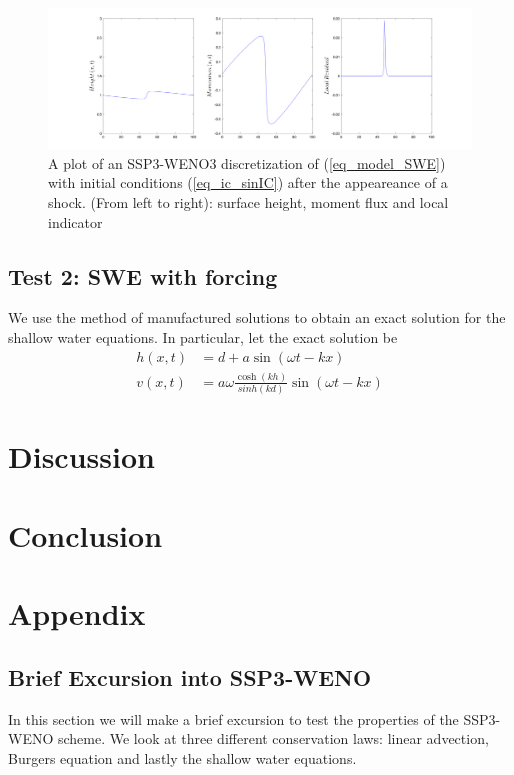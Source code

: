 \documentclass[12pt,a4paper]{article}
\numberwithin{equation}{section}
\theoremstyle{definition}
\newcommand{\qp}[1]{\left(#1\right)}
\begin{document}
\begin{figure}[H]
	\centering
	\includegraphics[scale=0.45]{../figures/fig_SHW_RK3_WENO3_rec3_fixed_621_dtdx_1}	
	\caption{A plot of an SSP3-WENO3 discretization of (\ref{eq_model_SWE}) with initial conditions (\ref{eq_ic_sinIC}) after the appeareance of a shock. (From left to right): surface height, moment flux and local indicator }
	\label{fig_aftershock}
\end{figure}





\subsection{Test 2: SWE with forcing}
We use the method of manufactured solutions to obtain an exact solution for the shallow water equations.  In particular, let the exact solution be 
\begin{equation}
\begin{aligned}
h\qp{x,t}&= d+a\sin\qp{\omega t-kx}\\
v\qp{x,t}&=a\omega \frac{\cosh\qp{kh}}{sinh(kd)}\sin(\omega t-k x)
\end{aligned}
\end{equation}


\section{Discussion}\label{sec:discussion}

\section{Conclusion}\label{sec:conclusion}




\appendix
\section{Appendix}
\subsection{Brief Excursion into SSP3-WENO}
In this section we will make a brief excursion to test the properties of the SSP3-WENO scheme. We look at three different conservation laws: linear advection, Burgers equation and lastly the shallow water equations.  
\end{document}
